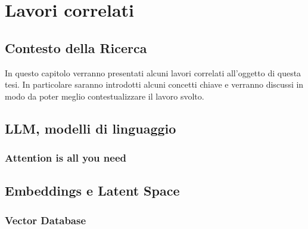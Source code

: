 \chapter{Lavori correlati}
\label{ch:lavori-correlati}

\section{Contesto della Ricerca}
\label{sec:contesto-della-ricerca}
In questo capitolo verranno presentati alcuni lavori
correlati all'oggetto di questa tesi.
In particolare saranno introdotti alcuni concetti chiave e
verranno discussi in modo da poter meglio contestualizzare
il lavoro svolto.

\section{LLM, modelli di linguaggio}
\label{sec:llm-modelli-di-linguaggio}

\subsection{Attention is all you need}
\label{sec:attention-is-all-you-need}

\section{Embeddings e Latent Space}
\label{sec:embedding-e-latent-space}

\subsection{Vector Database}
\label{sec:vector-database}